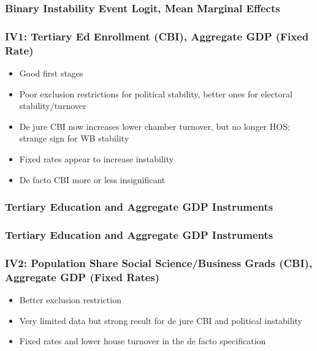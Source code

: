 \documentclass{beamer}
\begin{document}
    \begin{frame}
        \frametitle{Binary Instability Event Logit, Mean Marginal Effects}
        {
            \let\oldcentering\centering
            \renewcommand\centering{\tiny\oldcentering}
            
        }
    \end{frame}

    \begin{frame}
        \frametitle{IV1: Tertiary Ed Enrollment (CBI), Aggregate GDP (Fixed Rate)}
        \begin{itemize}
            \item Good first stages
            \item Poor exclusion restrictions for political stability, better ones for electoral stability/turnover
            \item De jure CBI now increases lower chamber turnover, but no longer HOS; strange sign for WB stability
            \item Fixed rates appear to increase instability
            \item De facto CBI more or less insignificant
        \end{itemize}
    \end{frame}

    \begin{frame}
        \frametitle{Tertiary Education and Aggregate GDP Instruments}
        {
            \let\oldcentering\centering
            \renewcommand\centering{\tiny\oldcentering}
            
        }
    \end{frame}

    \begin{frame}
        \frametitle{Tertiary Education and Aggregate GDP Instruments}
        {
            \let\oldcentering\centering
            \renewcommand\centering{\tiny\oldcentering}
            
        }
    \end{frame}

    \begin{frame}
        \frametitle{IV2: Population Share Social Science/Business Grads (CBI), Aggregate GDP (Fixed Rates)}
        \begin{itemize}
            \item Better exclusion restriction
            \item Very limited data but strong result for de jure CBI and political instability
            \item Fixed rates and lower house turnover in the de facto specification
        \end{itemize}
    \end{frame}
\end{document}
